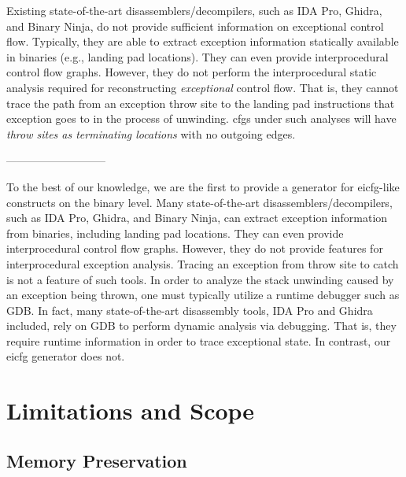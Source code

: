 Existing state-of-the-art disassemblers/decompilers, such as IDA Pro, Ghidra, and Binary Ninja, do not provide sufficient information on exceptional control flow.
Typically, they are able to extract exception information statically available in binaries (e.g., landing pad locations).
They can even provide interprocedural control flow graphs.
However, they do not perform the interprocedural static analysis required for reconstructing \emph{exceptional} control flow.
That is, they cannot trace the path from an exception throw site to the landing pad instructions that exception goes to in the process of unwinding.
\Acp{cfg} under such analyses will have \emph{throw sites as terminating locations} with no outgoing edges.


---------------------------

To the best of our knowledge, we are the first to provide a generator for
\ac{eicfg}-like constructs on the binary level.
Many state-of-the-art disassemblers/decompilers, such as IDA Pro, Ghidra, and Binary Ninja,
can extract exception information from binaries, including landing pad locations.
They can even provide interprocedural control flow graphs.
However, they do not provide features for interprocedural exception analysis.
Tracing an exception from throw site to catch is not a feature of such tools.
In order to analyze the stack unwinding caused by an exception being thrown,
one must typically utilize a runtime debugger such as GDB.
In fact, many state-of-the-art disassembly tools, IDA Pro and Ghidra included,
rely on GDB to perform dynamic analysis via debugging.
That is, they require runtime information in order to trace exceptional state.
In contrast, our \ac{eicfg} generator does not.

\section{Limitations and Scope}

\subsection{Memory Preservation}

